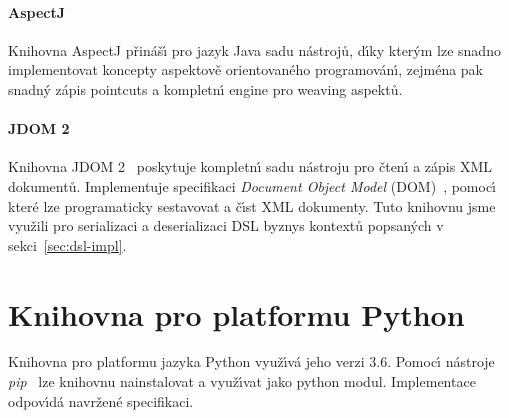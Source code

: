 \paragraph{AspectJ}

Knihovna AspectJ přináš\'{\i} pro jazyk Java sadu nástrojů,
d\'{\i}ky kter\'ym lze snadno implementovat koncepty aspektově orientovaného
programován\'{\i}, zejména pak snadn\'y zápis pointcuts a kompletn\'{\i}
engine pro weaving aspektů.


\paragraph{JDOM 2}

Knihovna JDOM 2~\cite{jdom2} poskytuje
kompletn\'{\i} sadu nástroju pro čten\'{\i} a zápis \gls{XML} dokumentů.
Implementuje specifikaci \textit{Document Object Model} (\gls{DOM})~\cite{wood2004document},
pomoc\'{\i} které lze programaticky sestavovat a č\'{\i}st \gls{XML} dokumenty.
Tuto knihovnu jsme využili pro serializaci a deserializaci
\gls{DSL} byznys kontextů popsan\'ych v sekci~\ref{sec:dsl-impl}.

\section{Knihovna pro platformu Python}

Knihovna pro platformu jazyka Python využ\'{\i}vá jeho
verzi 3.6. Pomoc\'{\i} nástroje \textit{pip}~\cite{pip}
lze knihovnu nainstalovat a využ\'{\i}vat jako python modul.
Implementace odpov\'{\i}dá navržené specifikaci.


